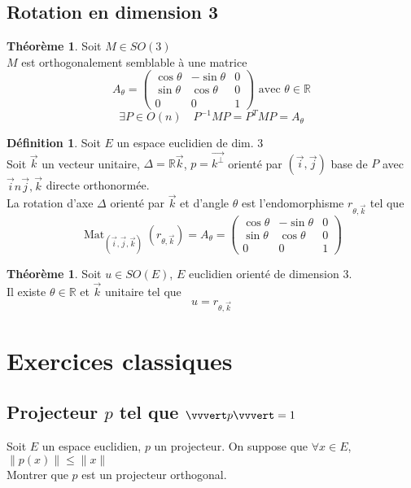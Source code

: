 \documentclass[10pt,a4paper]{article}
\theoremstyle{definition}
\newtheorem{theorem}[proposition]{Théorème}
\newtheorem{definition}[proposition]{Définition}
\DeclareMathOperator*{\mat}{Mat}
\begin{document}
\subsection{Rotation en dimension 3}
\begin{theorem}
    Soit \(M \in SO(3)\) \\
    \(M\) est orthogonalement semblable à une matrice
    \[A_\theta = \begin{pmatrix}
        \cos \theta & - \sin \theta & 0 \\
        \sin \theta & \cos \theta & 0 \\
        0 & 0 & 1
    \end{pmatrix} \text{ avec } \theta \in \mathbb{R}\]
    \[\boxed{\exists P \in O(n) \quad P^{-1} M P = P^T M P = A_\theta}\]
\end{theorem}

\pagebreak

\begin{definition}
    Soit \(E\) un espace euclidien de dim. 3 \\
    Soit \(\vec{k}\) un vecteur unitaire, \(\Delta = \mathbb{R} \vec{k}\), \(p = \vec{k^\perp}\) orienté par \((\vec{i}, \vec{j})\) base de \(P\) avec \(\vec{i}n \vec{j}, \vec{k}\) directe orthonormée. \\
    La rotation d'axe \(\Delta\) orienté par \(\vec{k}\) et d'angle \(\theta\) est l'endomorphisme \(r_{\theta, \vec{k}}\) tel que
    \[\mat_{(\vec{i}, \vec{j}, \vec{k})}(r_{\theta, \vec{k}}) = A_\theta = \begin{pmatrix}
        \cos \theta & - \sin \theta & 0 \\
        \sin \theta & \cos \theta & 0 \\
        0 & 0 & 1
    \end{pmatrix}\]
\end{definition}
\begin{theorem}
    Soit \(u \in SO(E)\), \(E\) euclidien orienté de dimension 3. \\
    Il existe \(\theta \in \mathbb{R}\) et \(\vec{k}\) unitaire tel que
    \[\boxed{u = r_{\theta, \vec{k}}}\]
\end{theorem}

\section{Exercices classiques}
\subsection{Projecteur \(p\) tel que \(\vvvert p \vvvert = 1\)}
\noindent Soit \(E\) un espace euclidien, \(p\) un projecteur. On suppose que \(\forall x \in E\), \(\lVert p(x) \rVert \leq \lVert x \rVert\) \\
Montrer que \(p\) est un projecteur orthogonal.
\end{document}
